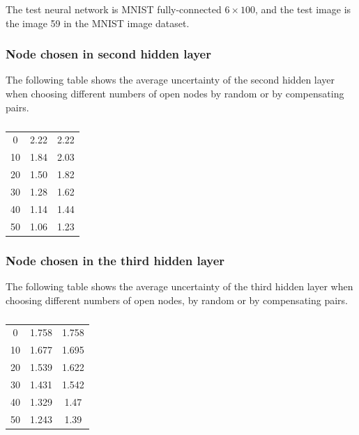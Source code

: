 \documentclass{llncs}
\begin{document}
The test neural network is MNIST fully-connected $6\times 100$, and the test image is the image 59 in the MNIST image dataset. 

\subsubsection*{Node chosen in second hidden layer}

The following table shows the average uncertainty of the second hidden layer when choosing different numbers of open nodes by random or by compensating pairs.

\begin{table}
	\centering
	\begin{tabular}{c|c|c}

	\text{Number of open nodes}  &  \text{Compensating} & \text{Random}  \\ \hline
	0  &  2.22 & 2.22  \\ \hline
	10  &  1.84 & 2.03  \\ \hline
	20  &  1.50 & 1.82  \\ \hline
	30  &  1.28 & 1.62  \\ \hline
	40  &  1.14 & 1.44  \\ \hline
	50  &  1.06 & 1.23  \\ \hline
\end{tabular}
\caption{}
\label{tab:example0}
\end{table}



\subsubsection*{Node chosen in the third hidden layer}

The following table shows the average uncertainty of the third hidden layer when choosing different numbers of open nodes, by random or by compensating pairs.


\begin{table}
	\centering
	\begin{tabular}{c|c|c}
	
	\text{Number of open nodes}  &  \text{Compensating} & \text{Random}  \\ \hline
	0  &  1.758 & 1.758  \\ \hline
	10  &  1.677 & 1.695  \\ \hline
	20  &  1.539 & 1.622  \\ \hline
	30  &  1.431 & 1.542  \\ \hline
	40  &  1.329 & 1.47  \\ \hline
	50  &  1.243 & 1.39  \\ \hline
\end{tabular}
\caption{}
\label{tab:example1}
\end{table}
\end{document}
